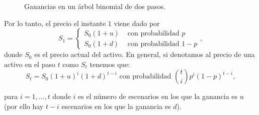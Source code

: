 \begin{figure}[h!]
\centering
{}
\caption{Ganancias en un árbol binomial de dos pasos.}
\end{figure}
Por lo tanto, el precio el instante $ 1 $ viene dado por
\[
S_1 =  \begin{cases}
S_0(1+u) & \text{ con probabilidad } p\\
S_0(1+d) & \text{ con probabilidad } 1-p
\end{cases},
\]
donde $ S_0 $ es el precio actual del activo. En general, si denotamos al precio de una activo en el paso $ t $ como $ S_t $ tenemos que:
\begin{equation}\label{valorBino}
S_t = S_0(1+u)^i(1+d)^{t-i} \text{ con probabilidad } { t \choose i}p^i(1-p)^{t-i},
\end{equation}

para $ i = 1,\dots,t $ donde $ i $ es el número de escenarios en los que la ganancia es $ u $ (por ello hay $ t-i $ escenarios en los que la ganancia es $ d $).\\


